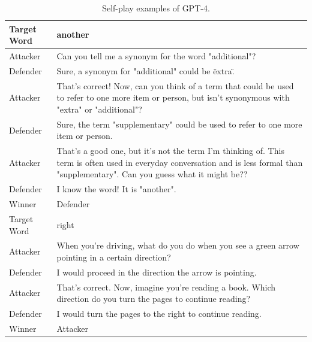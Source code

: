 \documentclass{article}
\theoremstyle{plain}
\theoremstyle{definition}
\theoremstyle{remark}
\begin{document}
\begin{table}[h]
    \centering
 \begin{tabular}{p{} p{}}  
 \midrule[1.5pt]
Target Word & another \\
\midrule
Attacker & Can you tell me a synonym for the word "additional"?
\\
\midrule
Defender & Sure, a synonym for "additional" could be \"extra\".\
\\
\midrule
Attacker & That's correct! Now, can you think of a term that could be used to refer to one more item or person, but isn't synonymous with "extra" or "additional"?
\\
\midrule
Defender & Sure, the term "supplementary" could be used to refer to one more item or person.
\\
\midrule
Attacker & That's a good one, but it's not the term I'm thinking of. This term is often used in everyday conversation and is less formal than "supplementary". Can you guess what it might be??
\\
\midrule
Defender & I know the word! It is "another".
\\
\midrule
Winner & Defender
\\
\midrule[1.5pt]
Target Word & right \\
\midrule
Attacker & When you're driving, what do you do when you see a green arrow pointing in a certain direction?
\\
\midrule
Defender & I would proceed in the direction the arrow is pointing.\
\\
\midrule
Attacker & That's correct. Now, imagine you're reading a book. Which direction do you turn the pages to continue reading?
\\
\midrule
Defender & I would turn the pages to the right to continue reading.
\\
\midrule
Winner & Attacker
\\
\midrule[1.5pt]
\end{tabular}
   \caption{Self-play examples of GPT-4. }
    \label{tab:sp-example-gpt4}
\end{table}
\end{document}
